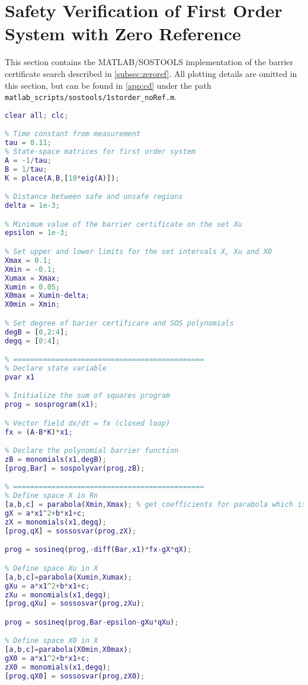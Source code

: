 \section{Safety Verification of First Order System with Zero Reference}\label{app:sos_noref}
This section contains the MATLAB/SOSTOOLS implementation of the barrier certificate search described in \autoref{subsec:zeroref}. All plotting details are omitted in this section, but can be found in \autoref{app:cd} under the path \texttt{matlab\_scripts/sostools/1storder\_noRef.m}.

\begin{lstlisting}[language=matlab]
% 1D system WITHOUT REFERENCE
clear all; clc; 

% Time constant from measurement
tau = 0.11;
% State-space matrices for first order system
A = -1/tau;
B = 1/tau;
K = place(A,B,[10*eig(A)]);

% Distance between safe and unsafe regions
delta = 1e-3;

% Minimum value of the barrier certificate on the set Xu
epsilon = 1e-3;

% Set upper and lower limits for the set intervals X, Xu and X0
Xmax = 0.1;
Xmin = -0.1;
Xumax = Xmax;
Xumin = 0.05;
X0max = Xumin-delta;
X0min = Xmin;

% Set degree of barier certificare and SOS polynomials
degB = [0,2:4];
degq = [0:4];

% =============================================
% Declare state variable
pvar x1 

% Initialize the sum of squares program
prog = sosprogram(x1);

% Vector field dx/dt = fx (closed loop)
fx = (A-B*K)*x1;

% Declare the polynomial barrier function
zB = monomials(x1,degB);
[prog,Bar] = sospolyvar(prog,zB);

% =============================================
% Define space X in Rn
[a,b,c] = parabola(Xmin,Xmax); % get coefficients for parabola which is positive for x ? [-0.1,0.1]
gX = a*x1^2+b*x1+c;
zX = monomials(x1,degq);
[prog,qX] = sossosvar(prog,zX);

prog = sosineq(prog,-diff(Bar,x1)*fx-gX*qX);

% Define space Xu in X
[a,b,c]=parabola(Xumin,Xumax);
gXu = a*x1^2+b*x1+c;
zXu = monomials(x1,degq);
[prog,qXu] = sossosvar(prog,zXu);

prog = sosineq(prog,Bar-epsilon-gXu*qXu);

% Define space X0 in X
[a,b,c]=parabola(X0min,X0max);
gX0 = a*x1^2+b*x1+c;
zX0 = monomials(x1,degq);
[prog,qX0] = sossosvar(prog,zX0);


\end{lstlisting}
